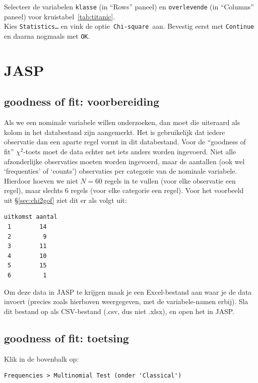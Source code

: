 \documentclass[
]{book}
\begin{document}
Selecteer de variabelen \texttt{klasse} (in ``Rows'' paneel) en \texttt{overlevende} (in
``Columns'' paneel) voor
kruistabel~\ref{tab:titanic}.\\
Kies \texttt{Statistics…} en vink de optie~\texttt{Chi-square}~aan. Bevestig eerst met
\texttt{Continue} en daarna nogmaals met \texttt{OK}.

\section{JASP}\label{jasp-16}

\subsection{goodness of fit: voorbereiding}\label{goodness-of-fit-voorbereiding-1}

Als we een nominale variabele willen onderzoeken, dan moet die uiteraard
als kolom in het databestand zijn aangemerkt. Het is gebruikelijk dat iedere observatie dan een aparte regel vormt in dit databestand. Voor de ``goodness of fit'' \(\chi^2\)-toets moet de data echter net iets anders worden ingevoerd. Niet alle afzonderlijke observaties moeten worden ingevoerd, maar de aantallen (ook wel `frequenties' of `counts') observaties per categorie van de nominale variabele. Hierdoor hoeven we niet \(N=60\) regels in te vullen (voor elke observatie een regel), maar slechts 6 regels (voor elke categorie een regel). Voor het voorbeeld uit §\ref{sec:chi2gof} ziet dit er als volgt uit:

\begin{verbatim}
uitkomst aantal
 1        14
 2         9
 3        11
 4        10
 5        15
 6         1
\end{verbatim}

Om deze data in JASP te krijgen maak je een Excel-bestand aan waar je de data invoert (precies zoals hierboven weergegeven, met de variabele-namen erbij).
Sla dit bestand op als CSV-bestand (.csv, dus niet .xlsx), en open het in JASP.

\subsection{goodness of fit: toetsing}\label{goodness-of-fit-toetsing-1}

Klik in de bovenbalk op:

\begin{verbatim}
Frequencies > Multinomial Test (onder 'Classical')
\end{verbatim}
\end{document}
